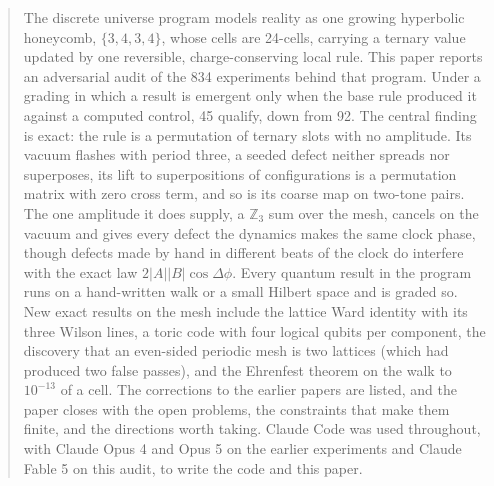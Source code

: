 \begin{abstract}
The discrete universe program models reality as one growing hyperbolic honeycomb, $\{3,4,3,4\}$, whose cells are
24-cells, carrying a ternary value updated by one reversible, charge-conserving local rule. This paper reports an
adversarial audit of the 834 experiments behind that program. Under a grading in which a result is emergent only
when the base rule produced it against a computed control, 45 qualify, down from 92. The central finding is exact:
the rule is a permutation of ternary slots with no amplitude. Its vacuum flashes with period three, a seeded defect
neither spreads nor superposes, its lift to superpositions of configurations is a permutation matrix with zero
cross term, and so is its coarse map on two-tone pairs. The one amplitude it does supply, a $\mathbb{Z}_3$ sum over
the mesh, cancels on the vacuum and gives every defect the dynamics makes the same clock phase, though defects made by hand in
different beats of the clock do interfere with the exact law $2|A||B|\cos\Delta\phi$. Every quantum
result in the program runs on a hand-written walk or a small Hilbert space and is graded so. New exact results on
the mesh include the lattice Ward identity with its three Wilson lines, a toric code with four logical qubits per
component, the discovery that an even-sided periodic mesh is two lattices (which had produced two false passes),
and the Ehrenfest theorem on the walk to $10^{-13}$ of a cell. The corrections to the earlier papers are listed, and
the paper closes with the open problems, the constraints that make them finite, and the directions worth taking.
Claude Code was used throughout, with Claude Opus 4 and Opus 5 on the earlier experiments and Claude Fable 5 on
this audit, to write the code and this paper.
\end{abstract}

